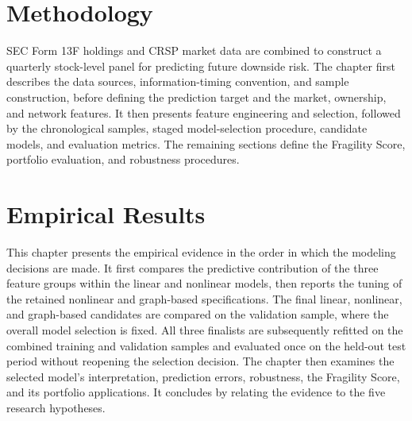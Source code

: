\documentclass[12pt,a4paper]{report}
\begin{document}







\chapter{Methodology}
\label{chap:methodology}

SEC Form 13F holdings and CRSP market data are combined to construct a quarterly stock-level panel for predicting future downside risk. The chapter first describes the data sources, information-timing convention, and sample construction, before defining the prediction target and the market, ownership, and network features. It then presents feature engineering and selection, followed by the chronological samples, staged model-selection procedure, candidate models, and evaluation metrics. The remaining sections define the Fragility Score, portfolio evaluation, and robustness procedures.









\chapter{Empirical Results}
\label{chap:results}

This chapter presents the empirical evidence in the order in which the modeling decisions are made. It first compares the predictive contribution of the three feature groups within the linear and nonlinear models, then reports the tuning of the retained nonlinear and graph-based specifications. The final linear, nonlinear, and graph-based candidates are compared on the validation sample, where the overall model selection is fixed. All three finalists are subsequently refitted on the combined training and validation samples and evaluated once on the held-out test period without reopening the selection decision. The chapter then examines the selected model's interpretation, prediction errors, robustness, the Fragility Score, and its portfolio applications. It concludes by relating the evidence to the five research hypotheses.
\end{document}
